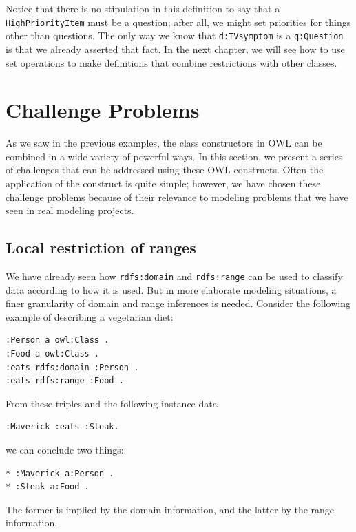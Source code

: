 Notice that there is no stipulation in this definition to say that a
\texttt{HighPriorityItem} must be a question; after all, we might set priorities
for things other than questions. The only way we know that \texttt{d:TVsymptom}
is a \texttt{q:Question} is that we already asserted that fact. In the next
chapter, we will see how to use set operations to make definitions that
combine restrictions with other classes.

\section{Challenge Problems}

As we saw in the previous examples, the class constructors in OWL can be
combined in a wide variety of powerful ways. In this section, we present
a series of challenges that can be addressed using these OWL constructs.
Often the application of the construct is quite simple; however, we have
chosen these challenge problems because of their relevance to modeling
problems that we have seen in real modeling projects.

\subsection{Local restriction of ranges}
\label{lror}
We have already seen how \texttt{rdfs:domain} and \texttt{rdfs:range} can be used to
classify data according to how it is used. But in more elaborate
modeling situations, a finer granularity of domain and range inferences
is needed. Consider the following example of describing a vegetarian
diet:

\begin{lstlisting}
:Person a owl:Class .
:Food a owl:Class .
:eats rdfs:domain :Person .
:eats rdfs:range :Food .
\end{lstlisting}

From these triples and the following instance data

\begin{lstlisting}
:Maverick :eats :Steak.
\end{lstlisting}

we can conclude two things:

\begin{lstlisting}
* :Maverick a:Person .
* :Steak a:Food .
\end{lstlisting}

The former is implied by the domain information, and the latter by the
range information.

